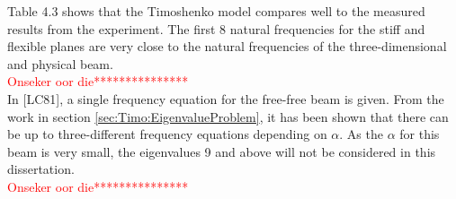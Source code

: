 \documentclass[../../main.tex]{subfiles}
\begin{document}
\FloatBarrier

Table 4.3 shows that the Timoshenko model compares well to the measured results from the experiment. The first 8 natural frequencies for the stiff and flexible planes are very close to the natural frequencies of the three-dimensional and physical beam.\\

\textcolor{red}{Onseker oor die***************}\\
In [LC81], a single frequency equation for the free-free beam is given. From the work in section \ref{sec:Timo:EigenvalueProblem}, it has been shown that there can be up to three-different frequency equations depending on $\alpha$. As the $\alpha$ for this beam is very small, the eigenvalues 9 and above will not be considered in this dissertation.\\
\textcolor{red}{Onseker oor die***************}
\end{document}

